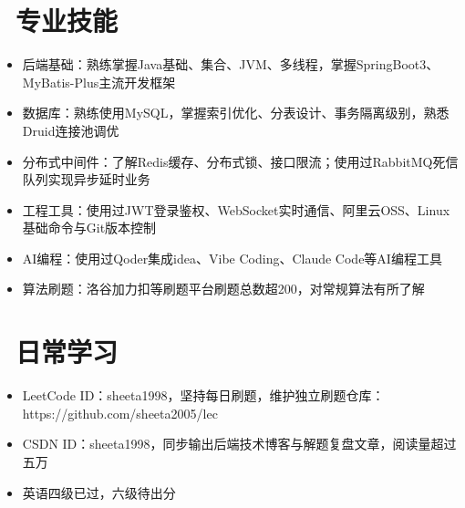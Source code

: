 \documentclass{resume}
\begin{document}
\section{\faCogs\ 专业技能}
\begin{itemize}[parsep=0.5ex]
  \item 后端基础：熟练掌握Java基础、集合、JVM、多线程，掌握SpringBoot3、MyBatis-Plus主流开发框架
  \item 数据库：熟练使用MySQL，掌握索引优化、分表设计、事务隔离级别，熟悉Druid连接池调优
  \item 分布式中间件：了解Redis缓存、分布式锁、接口限流；使用过RabbitMQ死信队列实现异步延时业务
  \item 工程工具：使用过JWT登录鉴权、WebSocket实时通信、阿里云OSS、Linux基础命令与Git版本控制
  \item AI编程：使用过Qoder集成idea、Vibe Coding、Claude Code等AI编程工具
  \item 算法刷题：洛谷加力扣等刷题平台刷题总数超200，对常规算法有所了解
\end{itemize}

\section{\faBook\ 日常学习}
\begin{itemize}[parsep=0.5ex]
  \item LeetCode ID：sheeta1998，坚持每日刷题，维护独立刷题仓库：https://github.com/sheeta2005/lec
  \item CSDN ID：sheeta1998，同步输出后端技术博客与解题复盘文章，阅读量超过五万
  \item 英语四级已过，六级待出分
\end{itemize}
\end{document}
